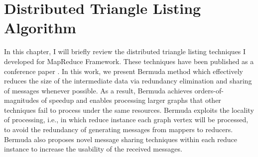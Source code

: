 \chapter{Distributed Triangle Listing Algorithm}
\label{chp:bec}
In this chapter, I will briefly review the distributed triangle listing techniques I developed for MapReduce Framework. These techniques have been published as a conference paper \cite{bermuda}. In this work, we present Bermuda method which effectively reduces the size of the intermediate data via redundancy elimination and sharing of messages whenever possible. As a result, Bermuda achieves orders-of-magnitudes of speedup and enables processing larger graphs that other techniques fail to process under the same resources. Bermuda exploits the locality of processing, i.e.,  in which reduce instance each graph vertex will be processed, to avoid the redundancy of generating messages from mappers to reducers. Bermuda also proposes novel message sharing techniques within each reduce instance to increase the usability of the received messages. 




